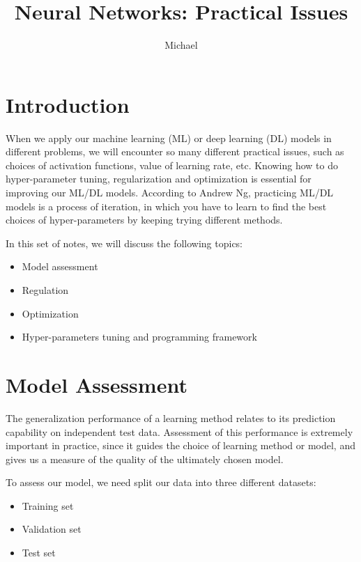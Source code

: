 \documentclass[12pt]{article}
\theoremstyle{definition}
\numberwithin{equation}{section}
\begin{document}


\title{Neural Networks: Practical Issues}
\author{Michael}
\date{}

\maketitle

\section{Introduction}


When we apply our machine learning (ML) or deep learning (DL) models in different problems, we will encounter so many different practical issues, such as choices of activation functions, value of learning rate, etc. Knowing how to do hyper-parameter tuning, regularization and optimization is essential for improving our ML/DL models. According to Andrew Ng, practicing ML/DL models is a process of iteration, in which you have to learn to find the best choices of hyper-parameters by keeping trying different methods. 

In this set of notes, we will discuss the following topics:
\begin{itemize}
	\item Model assessment 
	\item Regulation 
	\item Optimization
	\item Hyper-parameters tuning and programming framework
\end{itemize}

\section{Model Assessment}

The generalization performance of a learning method relates to its prediction capability on independent test data. Assessment of this performance is extremely important in practice, since it guides the choice of learning method or model, and gives us a measure of the quality of the ultimately chosen model. 

To assess our model, we need split our data into three different datasets:
\begin{itemize}
	\item Training set
	\item Validation set
	\item Test set
\end{itemize}
\end{document}
